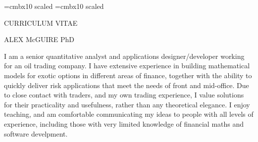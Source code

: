 \font\titlesize=cmbx10 scaled
\font\namesize=cmbx10 scaled
\vsize=10in
\hsize=8in
\voffset -0.4in
\hoffset -0.9in
\vskip 1cm
\centerline{\titlesize CURRICULUM VITAE}
\vskip 0.4in
\centerline{\namesize ALEX McGUIRE PhD}
\vskip 0.2in
\def\jobskip{\noalign{\bigskip}}
\def\posskip{\noalign{\medskip}}
\midinsert
\narrower\narrower\narrower
\noindent I am a senior quantitative analyst and applications designer/developer working for an oil trading company. I have extensive experience in building mathematical models for exotic options in 
different areas of finance, together with the ability to quickly deliver risk applications that meet the needs of front and mid-office. Due to close contact with traders, and my own trading experience, I value
solutions for their practicality and usefulness, rather than any theoretical elegance. I enjoy teaching, and am comfortable communicating my ideas to people with all
levels of experience, including those with very limited knowledge of financial maths and software develpment.
\endinsert


